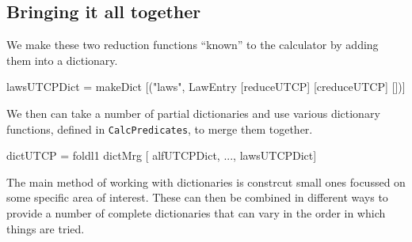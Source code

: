 \subsection{Bringing it all together}

We make these two reduction functions ``known'' to the calculator
by adding them into a dictionary.
\begin{code}
lawsUTCPDict
 = makeDict [("laws", LawEntry [reduceUTCP] [creduceUTCP] [])]
\end{code}
We then can take a number of partial dictionaries and use various
dictionary functions,
defined in \texttt{CalcPredicates}, to merge them together.
\begin{code}
dictUTCP = foldl1 dictMrg [ alfUTCPDict, ..., lawsUTCPDict]
\end{code}
The main method of working with dictionaries is constrcut small ones
focussed on some specific area of interest.
These can then be combined in different ways to provide a number of complete
dictionaries that can vary in the order in which things are tried.









